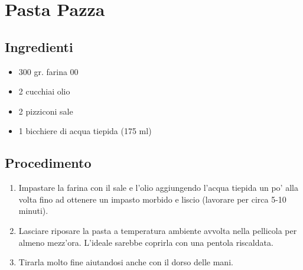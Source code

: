 \section{Pasta Pazza}
\subsection{Ingredienti}
\begin{itemize}
\item 300 gr. farina 00  
\item 2 cucchiai olio  
\item 2 pizziconi sale  
\item 1 bicchiere di acqua tiepida (175 ml)
\end{itemize}
\subsection{Procedimento}
\begin{enumerate}
\item  Impastare la farina con il sale e l'olio aggiungendo l'acqua tiepida un po' alla volta fino ad ottenere un impasto morbido e liscio (lavorare per circa 5-10 minuti).  
\item  Lasciare riposare la pasta a temperatura ambiente avvolta nella pellicola per almeno mezz'ora. L'ideale sarebbe coprirla con una pentola riscaldata.  
\item  Tirarla molto fine aiutandosi anche con il dorso delle mani.
\end{enumerate}
